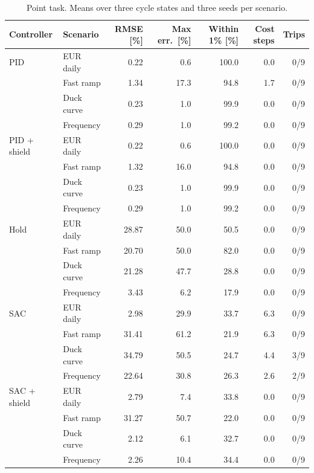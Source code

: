 \documentclass[11pt,a4paper]{article}
\begin{document}
\begin{table}[!htbp]
  \centering
  \caption{Point task. Means over three cycle states and three seeds per scenario.}
  \label{tab:results-point}
  \small
  \begin{tabular}{@{}llrrrrr@{}}
    \toprule
    Controller & Scenario & RMSE [\%] & Max err.\ [\%] & Within 1\% [\%] & Cost steps & Trips \\
    \midrule
    PID & EUR daily & 0.22 & 0.6 & 100.0 & 0.0 & 0/9 \\
 & Fast ramp & 1.34 & 17.3 & 94.8 & 1.7 & 0/9 \\
 & Duck curve & 0.23 & 1.0 & 99.9 & 0.0 & 0/9 \\
 & Frequency & 0.29 & 1.0 & 99.2 & 0.0 & 0/9 \\
\midrule
PID + shield & EUR daily & 0.22 & 0.6 & 100.0 & 0.0 & 0/9 \\
 & Fast ramp & 1.32 & 16.0 & 94.8 & 0.0 & 0/9 \\
 & Duck curve & 0.23 & 1.0 & 99.9 & 0.0 & 0/9 \\
 & Frequency & 0.29 & 1.0 & 99.2 & 0.0 & 0/9 \\
\midrule
Hold & EUR daily & 28.87 & 50.0 & 50.5 & 0.0 & 0/9 \\
 & Fast ramp & 20.70 & 50.0 & 82.0 & 0.0 & 0/9 \\
 & Duck curve & 21.28 & 47.7 & 28.8 & 0.0 & 0/9 \\
 & Frequency & 3.43 & 6.2 & 17.9 & 0.0 & 0/9 \\
\midrule
SAC & EUR daily & 2.98 & 29.9 & 33.7 & 6.3 & 0/9 \\
 & Fast ramp & 31.41 & 61.2 & 21.9 & 6.3 & 0/9 \\
 & Duck curve & 34.79 & 50.5 & 24.7 & 4.4 & 3/9 \\
 & Frequency & 22.64 & 30.8 & 26.3 & 2.6 & 2/9 \\
\midrule
SAC + shield & EUR daily & 2.79 & 7.4 & 33.8 & 0.0 & 0/9 \\
 & Fast ramp & 31.27 & 50.7 & 22.0 & 0.0 & 0/9 \\
 & Duck curve & 2.12 & 6.1 & 32.7 & 0.0 & 0/9 \\
 & Frequency & 2.26 & 10.4 & 34.4 & 0.0 & 0/9 \\
\bottomrule
  \end{tabular}
\end{table}
\end{document}
